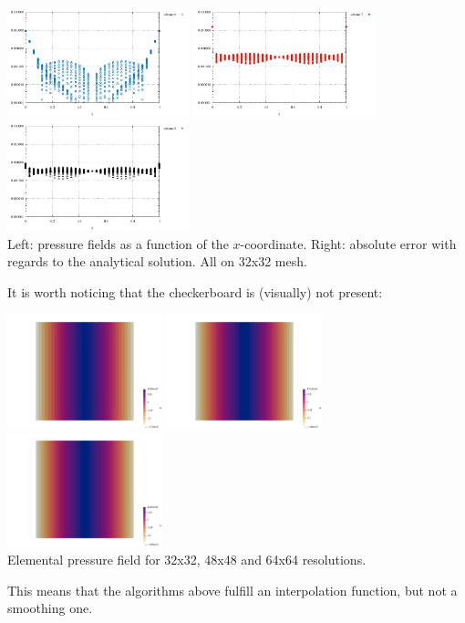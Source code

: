 \begin{center}
\includegraphics[width=5.3cm]{python_codes/fieldstone_12/results/reg/q6_error}
\includegraphics[width=5.3cm]{python_codes/fieldstone_12/results/reg/q7_error}
\includegraphics[width=5.3cm]{python_codes/fieldstone_12/results/reg/q8_error}\\
{\captionfont Left: pressure fields as a function of the $x$-coordinate. 
Right: absolute error with regards to the analytical solution. All on 32x32 mesh.}
\end{center}

It is worth noticing that the checkerboard is (visually) not present:
\begin{center}
\includegraphics[width=4.5cm]{python_codes/fieldstone_12/results/reg/p32}
\includegraphics[width=4.5cm]{python_codes/fieldstone_12/results/reg/p48}
\includegraphics[width=4.5cm]{python_codes/fieldstone_12/results/reg/p64}\\
{\captionfont Elemental pressure field for 32x32, 48x48 and 64x64 resolutions.}
\end{center}
This means that the algorithms above fulfill an interpolation function, but not a smoothing one.

